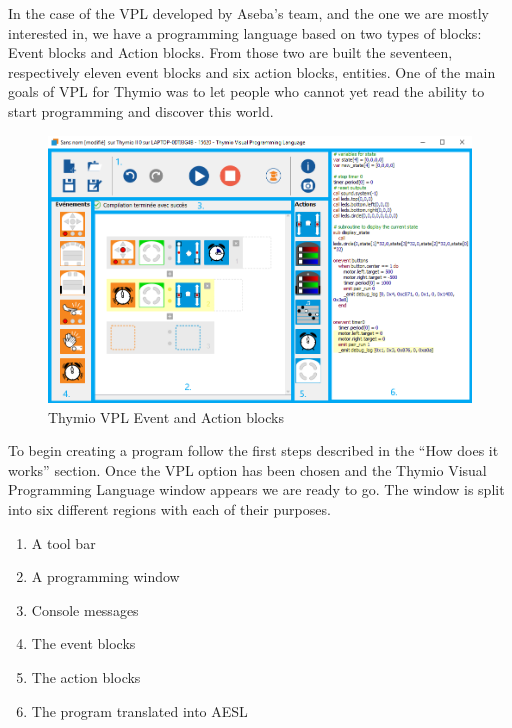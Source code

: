 \documentclass{scrartcl}
\begin{document}
In the case of the VPL developed by Aseba’s team, and the one we are mostly interested in, we have a programming language based on two types of blocks: Event blocks and Action blocks. 
From those two are built the seventeen, respectively eleven event blocks and six action blocks, entities. 
One of the main goals of VPL for Thymio was to let people who cannot yet read the ability to start programming and discover this world.\\

\begin{figure}[h]
  \includegraphics[width=\textwidth]{./VPL/Thymio_VPL_window}
  \caption{Thymio VPL Event and Action blocks}
  \label{fig:thymio_vpl_blocks}
\end{figure}

To begin creating a program follow the first steps described in the “How does it works” section. 
Once the VPL option has been chosen and the Thymio Visual Programming Language window appears we are ready to go. 
The window is split into six different regions with each of their purposes.
\begin{enumerate}
  \item A tool bar
  \item A programming window
  \item Console messages
  \item The event blocks
  \item The action blocks
  \item The program translated into AESL
\end{enumerate}
\end{document}
